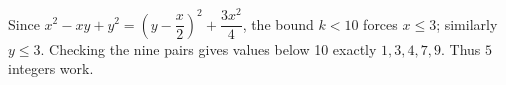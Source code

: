Since $x^2-xy+y^2=(y-\dfrac{x}{2})^2+\dfrac{3x^2}{4}$, the bound $k<10$ forces $x\le3$; similarly $y\le3$. Checking the nine pairs gives values below 10 exactly $1,3,4,7,9$. Thus $\boxed5$ integers work.
